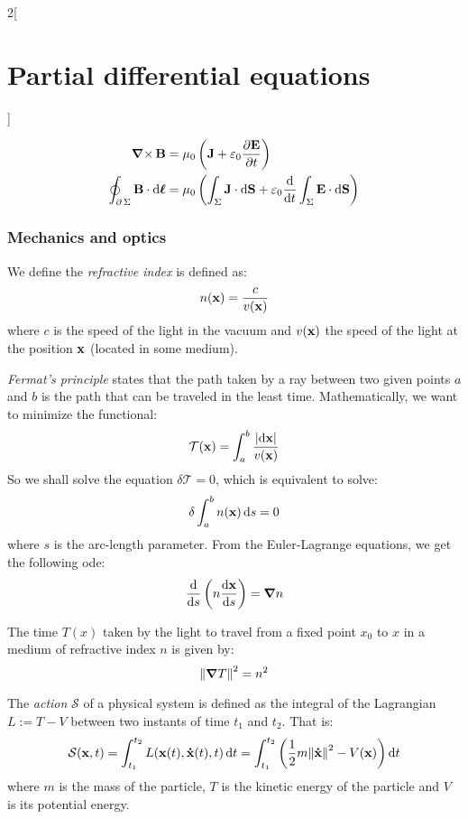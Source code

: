 \documentclass[../../../main_math.tex]{subfiles}
\begin{document}
\begin{multicols}{2}[\section{Partial differential equations}]
\begin{proposition}
    \begin{align*}
      \operatorname{\boldsymbol{\mathrm{\nabla}}\times}\boldsymbol{\mathrm{B}}                                   & =\mu_0\left(\boldsymbol{\mathrm{J}}+\varepsilon_0\pdv{\boldsymbol{\mathrm{E}}}{t}\right)                                                        \\
      \oint_{\operatorname{\partial}{\Sigma}}\boldsymbol{\mathrm{B}}\cdot \dd{\boldsymbol{\mathrm{\ell}}} & =\mu_0 \left(\int_\Sigma\boldsymbol{\mathrm{J}}\cdot\dd{\boldsymbol{\mathrm{S}}}+\varepsilon_0\dv{}{t}\int_\Sigma\boldsymbol{\mathrm{E}}\cdot \dd{\boldsymbol{\mathrm{S}}}\right)
    \end{align*}
  \end{proposition}
  \subsubsection{Mechanics and optics}
  \begin{definition}
    We define the \emph{refractive index} is defined as: $$n(\boldsymbol{\mathrm{x}})=\frac{c}{v(\boldsymbol{\mathrm{x}})}$$ where $c$ is the speed of the light in the vacuum and $v(\boldsymbol{\mathrm{x}})$ the speed of the light at the position $\boldsymbol{\mathrm{x}}$ (located in some medium).
  \end{definition}
  \begin{proposition}
    \emph{Fermat's principle} states that the path taken by a ray between two given points $a$ and $b$ is the path that can be traveled in the least time. Mathematically, we want to minimize the functional: $$\mathcal{T}(\boldsymbol{\mathrm{x}})=\int_a^b\frac{\abs{\dd{\boldsymbol{\mathrm{x}}}}}{v(\boldsymbol{\mathrm{x}})}$$
    So we shall solve the equation $\delta \mathcal{T}=0$, which is equivalent to solve: $$\delta\int_a^bn(\boldsymbol{\mathrm{x}})\dd{s}=0$$ where $s$ is the arc-length parameter. From the Euler-Lagrange equations, we get the following ode: $$\dv{}{s}\left(n\dv{\boldsymbol{\mathrm{x}}}{s}\right)=\grad{n}$$
  \end{proposition}
  \begin{proposition}
    The time $T(x)$ taken by the light to travel from a fixed point $x_0$ to $x$ in a medium of refractive index $n$ is given by: $${\left\|\grad{T}\right\|}^2=n^2$$
  \end{proposition}
  \begin{definition}
    The \emph{action} $\mathcal{S}$ of a physical system is defined as the integral of the Lagrangian $L:=T-V$ between two instants of time $t_1$ and $t_2$. That is: $$\mathcal{S}(\boldsymbol{\mathrm{x}},t)=\int_{t_1}^{t_2}L(\boldsymbol{\mathrm{x}}(t),\boldsymbol{\mathrm{\dot{x}}}(t),t)\dd{t}=\int_{t_1}^{t_2}\left(\frac{1}{2}m{\left\|\boldsymbol{\mathrm{\dot{x}}}\right\|}^2-V(\boldsymbol{\mathrm{x}})\right)\dd{t}$$
    where $m$ is the mass of the particle, $T$ is the kinetic energy of the particle and $V$ is its potential energy.
  \end{definition}

\end{multicols}
\end{document}
